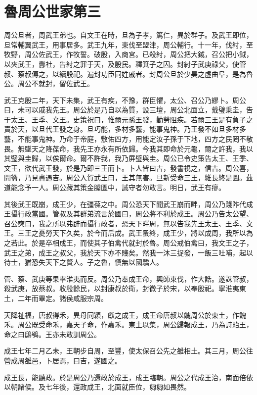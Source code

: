 \chapter{魯周公世家第三}

周公旦者，周武王弟也。自文王在時，旦為子孝，篤仁，異於群子。及武王即位，旦常輔翼武王，用事居多。武王九年，東伐至盟津，周公輔行。十一年，伐紂，至牧野，周公佐武王，作牧誓。破殷，入商宮。已殺紂，周公把大鉞，召公把小鉞，以夾武王，釁社，告紂之罪于天，及殷民。釋箕子之囚。封紂子武庚祿父，使管叔、蔡叔傅之，以續殷祀。遍封功臣同姓戚者。封周公旦於少昊之虛曲阜，是為魯公。周公不就封，留佐武王。

武王克殷二年，天下未集，武王有疾，不豫，群臣懼，太公、召公乃繆卜。周公曰，未可以戚我先王。周公於是乃自以為質，設三壇，周公北面立，戴璧秉圭，告于太王、王季、文王。史策祝曰，惟爾元孫王發，勤勞阻疾。若爾三王是有負子之責於天，以旦代王發之身。旦巧能，多材多藝，能事鬼神。乃王發不如旦多材多藝，不能事鬼神。乃命于帝庭，敷佑四方，用能定汝子孫于下地，四方之民罔不敬畏。無墜天之降葆命，我先王亦永有所依歸。今我其即命於元龜，爾之許我，我以其璧與圭歸，以俟爾命。爾不許我，我乃屏璧與圭。周公已令史策告太王、王季、文王，欲代武王發，於是乃即三王而卜。卜人皆曰吉，發書視之，信吉。周公喜，開籥，乃見書遇吉。周公入賀武王曰，王其無害。旦新受命三王，維長終是圖。茲道能念予一人。周公藏其策金縢匱中，誡守者勿敢言。明日，武王有瘳。

其後武王既崩，成王少，在彊葆之中。周公恐天下聞武王崩而畔，周公乃踐阼代成王攝行政當國。管叔及其群弟流言於國曰，周公將不利於成王。周公乃告太公望、召公奭曰，我之所以弗辟而攝行政者，恐天下畔周，無以告我先王太王、王季、文王。三王之憂勞天下久矣，於今而后成。武王蚤終，成王少，將以成周，我所以為之若此。於是卒相成王，而使其子伯禽代就封於魯。周公戒伯禽曰，我文王之子，武王之弟，成王之叔父，我於天下亦不賤矣。然我一沐三捉發，一飯三吐哺，起以待士，猶恐失天下之賢人。子之魯，慎無以國驕人。

管、蔡、武庚等果率淮夷而反。周公乃奉成王命，興師東伐，作大誥。遂誅管叔，殺武庚，放蔡叔。收殷餘民，以封康叔於衛，封微子於宋，以奉殷祀。寧淮夷東土，二年而畢定。諸侯咸服宗周。

天降祉福，唐叔得禾，異母同穎，獻之成王，成王命唐叔以餽周公於東土，作餽禾。周公既受命禾，嘉天子命，作嘉禾。東土以集，周公歸報成王，乃為詩貽王，命之曰鴟鸮。王亦未敢訓周公。

成王七年二月乙未，王朝步自周，至豐，使太保召公先之雒相土。其三月，周公往營成周雒邑，卜居焉，曰吉，遂國之。

成王長，能聽政。於是周公乃還政於成王，成王臨朝。周公之代成王治，南面倍依以朝諸侯。及七年後，還政成王，北面就臣位，匔匔如畏然。


